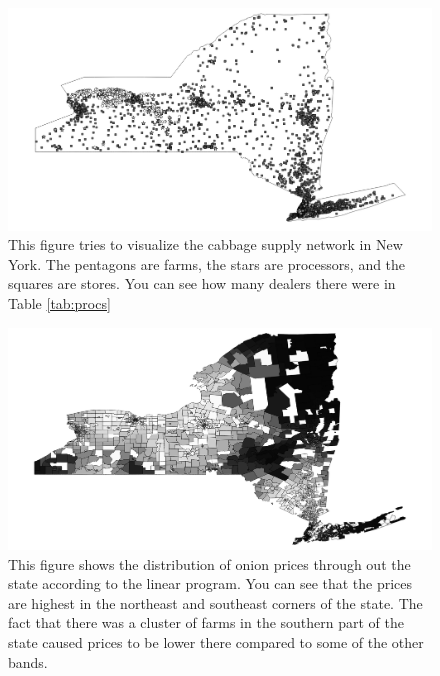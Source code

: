 \documentclass{report}
\begin{document}
\begin{figure}
\centering
\begin{framed}
\includegraphics[scale=.50]{network_243}
\caption{This figure tries to visualize the cabbage supply network in New York. The pentagons are farms, the stars are processors, and the squares are stores. You can see how many dealers there were in Table \ref{tab:procs}}
\label{fig:network_243}
\end{framed}
\end{figure}


\begin{figure}
\centering
\begin{framed}
\includegraphics[scale=.50]{prices_49}
\caption{This figure shows the distribution of onion prices through out the state according to the linear program. You can see that the prices are highest in the northeast and southeast corners of the state. The fact that there was a cluster of farms in the southern part of the state caused prices to be lower there compared to some of the other bands.}
\label{fig:prices_49}
\end{framed}
\end{figure}
\end{document}
